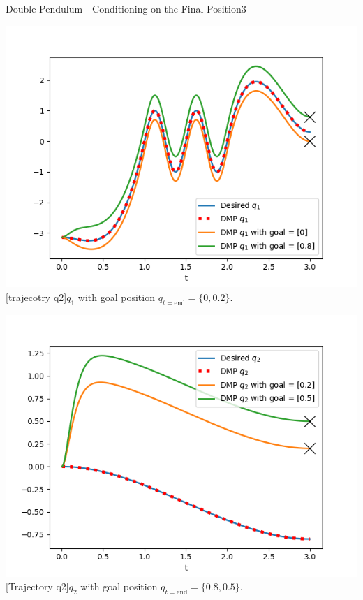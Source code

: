 \begin{questions}
\begin{question}{Double Pendulum - Conditioning on the Final Position}{3}
\begin{answer}
\begin{center}
	\begin{minipage}{0.45\linewidth} 
		\centering
		\includegraphics[width=\linewidth]{img/2d-q1.png}
		[trajecotry q2]{$q_1$ with goal position $q_{t=\mathrm{end}} = \{0, 0.2\}$.}
		\label{fig:q1_new_goal}
	\end{minipage}
	\hfill
	\begin{minipage}{0.45\linewidth} 
		\centering
		\includegraphics[width=\linewidth]{img/2d-q2.png}
		[Trajectory q2]{$q_2$ with goal position $q_{t=\mathrm{end}} = \{0.8, 0.5\}$.}
		\label{fig:q2_new_goal}
	\end{minipage}
\end{center}
\end{answer}



\end{question}
\end{questions}
